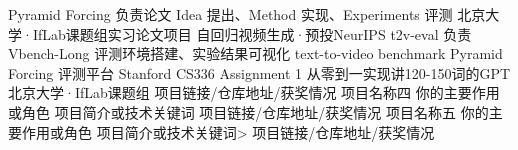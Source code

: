 \vspace{-3mm}
\begin{cventries}

  \cvproject
    {Pyramid Forcing} %
    {负责论文 Idea 提出、Method 实现、Experiments 评测} %
    {北京大学·IfLab课题组实习论文项目} %
    {自回归视频生成·预投NeurIPS} %
  \vspace{-5mm}
  \cvproject
    {t2v-eval} %
    {负责Vbench-Long 评测环境搭建、实验结果可视化} %
    {text-to-video  benchmark} %
    {Pyramid Forcing 评测平台} %
  \vspace{-5mm}
  \cvproject
    {Stanford CS336 Assignment 1} %
    {从零到一实现讲120-150词的GPT} %
    {北京大学·IfLab课题组} %
    {项目链接/仓库地址/获奖情况} %
  \vspace{-5mm}
  \cvproject
    {项目名称四} %
    {你的主要作用或角色} %
    {项目简介或技术关键词} %
    {项目链接/仓库地址/获奖情况} %
  \vspace{-5mm}
  \cvproject
    {项目名称五} %
    {你的主要作用或角色} %
    {项目简介或技术关键词>} %
    {项目链接/仓库地址/获奖情况} %

\end{cventries}

\vspace{-8mm}
